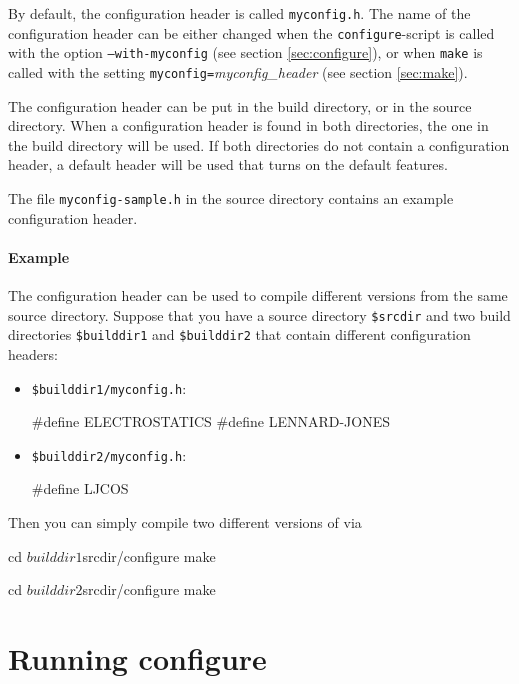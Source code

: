 By default, the configuration header is called \texttt{myconfig.h}.
The name of the configuration header can be either changed when the
\texttt{configure}-script is called with the option
\texttt{--with-myconfig} (see section \vref{sec:configure}), or when
\texttt{make} is called with the setting
\texttt{myconfig=}\textit{myconfig\_header} (see section
\vref{sec:make}).

The configuration header can be put in the build directory, or in the
source directory. When a configuration header is found in both
directories, the one in the build directory will be used. If both
directories do not contain a configuration header, a default header
will be used that turns on the default features.

The file \texttt{myconfig-sample.h} in the source directory contains
an example configuration header.

\paragraph{Example}
The configuration header can be used to compile different versions
from the same source directory. Suppose that you have a source
directory \texttt{\$srcdir} and two build directories
\texttt{\$builddir1} and \texttt{\$builddir2} that contain different
configuration headers:

\begin{itemize}
\item \texttt{\$builddir1/myconfig.h}:
\begin{code}
#define ELECTROSTATICS
#define LENNARD-JONES
\end{code}

\item \texttt{\$builddir2/myconfig.h}:
\begin{code}
#define LJCOS
\end{code}
\end{itemize}

\noindent Then you can simply compile two different versions of \es{} via
\begin{code}
cd $builddir1
$srcdir/configure
make

cd $builddir2
$srcdir/configure
make
\end{code}


\section{Running configure}
\label{sec:configure}

